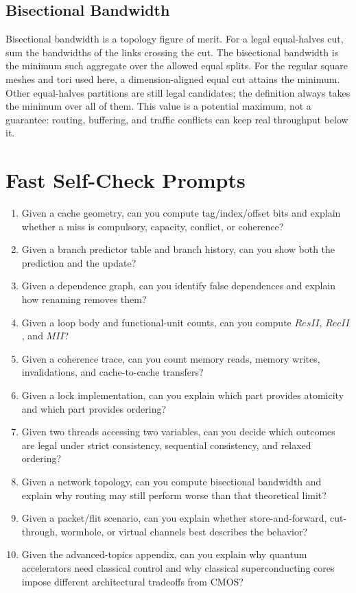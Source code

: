 \subsection*{Bisectional Bandwidth}
Bisectional bandwidth is a topology figure of merit.
For a legal equal-halves cut, sum the bandwidths of the links crossing the cut.
The bisectional bandwidth is the minimum such aggregate over the allowed equal splits.
For the regular square meshes and tori used here, a dimension-aligned equal cut attains the minimum.
Other equal-halves partitions are still legal candidates; the definition always takes the minimum over all of them.
This value is a potential maximum, not a guarantee: routing, buffering, and traffic conflicts can keep real throughput below it.


\section{Fast Self-Check Prompts}\label{sec:app-e-self-check}
\begin{enumerate}
    \item Given a cache geometry, can you compute tag/index/offset bits and explain whether a miss is compulsory, capacity, conflict, or coherence?
    \item Given a branch predictor table and branch history, can you show both the prediction and the update?
    \item Given a dependence graph, can you identify false dependences and explain how renaming removes them?
    \item Given a loop body and functional-unit counts, can you compute $ResII$, $RecII$, and $MII$?
    \item Given a coherence trace, can you count memory reads, memory writes, invalidations, and cache-to-cache transfers?
    \item Given a lock implementation, can you explain which part provides atomicity and which part provides ordering?
    \item Given two threads accessing two variables, can you decide which outcomes are legal under strict consistency, sequential consistency, and relaxed ordering?
    \item Given a network topology, can you compute bisectional bandwidth and explain why routing may still perform worse than that theoretical limit?
    \item Given a packet/flit scenario, can you explain whether store-and-forward, cut-through, wormhole, or virtual channels best describes the behavior?
    \item Given the advanced-topics appendix, can you explain why quantum accelerators need classical control and why classical superconducting cores impose different architectural tradeoffs from CMOS?
\end{enumerate}
